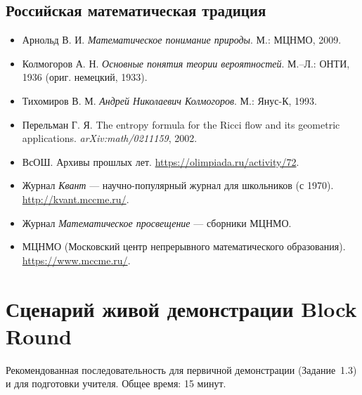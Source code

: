\documentclass[12pt,a4paper]{scrartcl}
\begin{document}
\subsection{Российская математическая традиция}
\begin{itemize}[leftmargin=1.3em,itemsep=0.15em,topsep=0.3em]
  \item Арнольд В. И. \emph{Математическое понимание природы}. М.: МЦНМО, 2009.
  \item Колмогоров А. Н. \emph{Основные понятия теории вероятностей}. М.--Л.: ОНТИ, 1936 (ориг. немецкий, 1933).
  \item Тихомиров В. М. \emph{Андрей Николаевич Колмогоров}. М.: Янус-К, 1993.
  \item Перельман Г. Я. The entropy formula for the Ricci flow and its geometric applications. \emph{arXiv:math/0211159}, 2002.
  \item ВсОШ. Архивы прошлых лет. \url{https://olimpiada.ru/activity/72}.
  \item Журнал \emph{Квант} --- научно-популярный журнал для школьников (с 1970). \url{http://kvant.mccme.ru/}.
  \item Журнал \emph{Математическое просвещение} --- сборники МЦНМО.
  \item МЦНМО (Московский центр непрерывного математического образования). \url{https://www.mccme.ru/}.
\end{itemize}

\newpage
\appendix
\renewcommand{\thesection}{\Asbuk{section}}
\setcounter{section}{0}

\section{Сценарий живой демонстрации Block Round}\label{ap:roteiro}

Рекомендованная последовательность для первичной демонстрации (Задание~1.3) и для подготовки учителя. Общее время: 15 минут.
\end{document}
